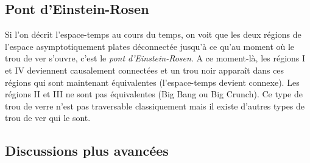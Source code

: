 \documentclass[a4paper,11pt]{report}
\theoremstyle{definition}
\theoremstyle{plain}
\theoremstyle{definition}
\theoremstyle{remark}
\begin{document}
        \subsection{Pont d'Einstein-Rosen}
        
            Si l'on décrit l'espace-temps au cours du temps, on voit que les deux régions de l'espace asymptotiquement plates déconnectée jusqu'à ce qu'au moment où le trou de ver s'ouvre, c'est le \textit{pont d'Einstein-Rosen}. A ce moment-là, les régions I et IV deviennent causalement connectées et un trou noir apparaît dans ces régions qui sont maintenant équivalentes (l'espace-temps devient connexe). Les régions II et III ne sont pas équivalentes (Big Bang ou Big Crunch). Ce type de trou de verre n'est pas traversable classiquement mais il existe d'autres types de trou de ver qui le sont.
        
        \subsection{Discussions plus avancées}
        
            
            
            
\end{document}
